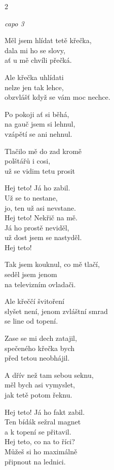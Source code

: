 \begin{multicols}{2}

\re{}
\textit{capo 3}

\ve{}
Měl jsem hlídat tetě křečka,\\                  
dala mi ho se slovy,\\
ať u mě chvíli přečká.
   
\ve{}
Ale křečka uhlídati\\
nelze jen tak lehce,\\
obzvlášť když se vám moc nechce.

\ve{}
Po pokoji ať si běhá,\\
na gauč jsem si lehnul,\\
vzápětí se ani nehnul.

\ve{}
Tlačilo mě do zad kromě\\
polštářů i cosi,\\
už se vidim tetu prosit

\cho{}
Hej teto! Já ho zabil.\\
Už se to nestane,\\
jo, ten už asi nevstane.\\
Hej teto! Nekřič na mě.\\
Já ho prostě neviděl,\\
už dost jsem se nastyděl.\\
Hej teto! 

\columnbreak


\ve{}
Tak jsem kouknul, co mě tlačí,\\
seděl jsem jenom\\
na televizním ovladači.

\ve{}
Ale křeččí švitoření\\
slyšet není, jenom zvláštní smrad\\
se line od topení.

\ve{}
Zase se mi dech zatajil,\\
spečeného křečka bych\\
před tetou neobhájil.

\ve{}
A dřív než tam sebou seknu,\\
měl bych asi vymyslet,\\
jak tetě potom řeknu.

\cho{}

\cho{}
Hej teto! Já ho fakt zabil.\\
Ten bídák sežral magnet\\
a k topení se přitavil.\\
Hej teto, co na to říci?\\
Můžeš si ho maximálně\\
připnout na lednici. \cho{}

\end{multicols}
\esong{}